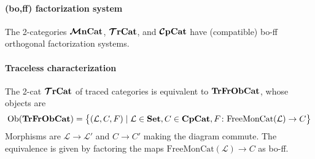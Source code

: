 \documentclass[11pt,oneside,article]{memoir}
\renewcommand{\LabSet}{\mathcal{L}}
\begin{document}
\paragraph{(bo,ff) factorization system} The 2-categories $\bm{\mathcal{M}}\mathbf{nCat}$, $\bm{\mathcal{T}}\mathbf{rCat}$, and $\bm{\mathcal{C}}\mathbf{pCat}$ have (compatible) bo-ff orthogonal factorization systems.
\paragraph{Traceless characterization} The 2-cat $\bm{\mathcal{T}}\mathbf{rCat}$ of traced categories is equivalent to $\mathbf{TrFrObCat}$, whose objects are
\[\Ob(\TrFrObCat)=\big\{(\LabSet,C,F)\mid \LabSet\in\Set, C\in\CompCat, F\colon\text{FreeMonCat}(\LabSet)\to C\big\}\]
Morphisms are $\LabSet\to\LabSet'$ and $C\to C'$ making the diagram commute. The equivalence is given by factoring the maps $\text{FreeMonCat}(\LabSet)\to C$ as bo-ff.
\end{document}
